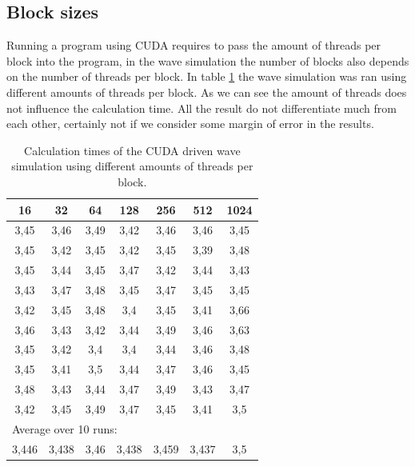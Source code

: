 \documentclass[a4paper]{article}
\begin{document}
	
	
	\subsection{Block sizes}
		Running a program using CUDA requires to pass the amount of threads per block into the program, in the wave simulation the number of blocks also depends on the number of threads per block.
		In table \ref{table:blockSizes} the wave simulation was ran using different amounts of threads per block.
		As we can see the amount of threads does not influence the calculation time.
		All the result do not differentiate much from each other, certainly not if we consider some margin of error in the results.
	
		\begin{table}[H]
			\caption{Calculation times of the CUDA driven wave simulation using different amounts of threads per block.}
			\label{table:blockSizes}
			\begin{center}
				\begin{tabular}{| c | c | c | c | c | c | c |}
					\hline
					16 & 32 & 64 & 128 & 256 & 512 & 1024\\ 
					\hline
					3,45 & 3,46 & 3,49 & 3,42 & 3,46 & 3,46 & 3,45\\ 
					\hline
					3,45 & 3,42 & 3,45 & 3,42 & 3,45 & 3,39 & 3,48\\ 
					\hline
					3,45 & 3,44 & 3,45 & 3,47 & 3,42 & 3,44 & 3,43\\ 
					\hline
					3,43 & 3,47 & 3,48 & 3,45 & 3,47 & 3,45 & 3,45\\ 
					\hline
					3,42 & 3,45 & 3,48 & 3,4 & 3,45 & 3,41 & 3,66\\ 
					\hline
					3,46 & 3,43 & 3,42 & 3,44 & 3,49 & 3,46 & 3,63\\ 
					\hline
					3,45 & 3,42 & 3,4 & 3,4 & 3,44 & 3,46 & 3,48\\ 
					\hline
					3,45 & 3,41 & 3,5 & 3,44 & 3,47 & 3,46 & 3,45\\ 
					\hline
					3,48 & 3,43 & 3,44 & 3,47 & 3,49 & 3,43 & 3,47\\ 
					\hline
					3,42 & 3,45 & 3,49 & 3,47 & 3,45 & 3,41 & 3,5\\ 
					\hline
					\multicolumn{7}{|l|}{Average over 10 runs:}\\
					\hline
					3,446 & 3,438 & 3,46 & 3,438 & 3,459 & 3,437 & 3,5\\ 
					\hline
				\end{tabular}
			\end{center}
		\end{table}
		
\end{document}
